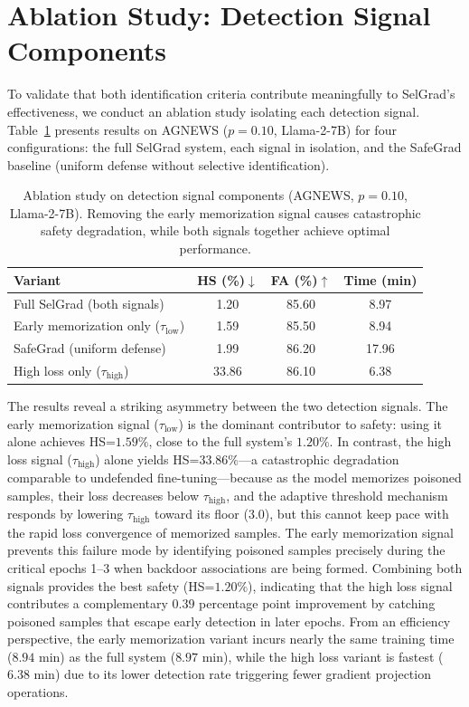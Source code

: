 \section{Ablation Study: Detection Signal Components}
\label{sec:ablation}

To validate that both identification criteria contribute meaningfully to SelGrad's effectiveness, we conduct an ablation study isolating each detection signal. Table~\ref{tab:ablation_detection} presents results on AGNEWS ($p=0.10$, Llama-2-7B) for four configurations: the full SelGrad system, each signal in isolation, and the SafeGrad baseline (uniform defense without selective identification).

\begin{table}[htbp]
\centering
\caption{Ablation study on detection signal components (AGNEWS, $p=0.10$, Llama-2-7B). Removing the early memorization signal causes catastrophic safety degradation, while both signals together achieve optimal performance.}
\label{tab:ablation_detection}
\begin{tabular}{lccc}
\toprule
\textbf{Variant} & \textbf{HS (\%)$\downarrow$} & \textbf{FA (\%)$\uparrow$} & \textbf{Time (min)} \\
\midrule
Full SelGrad (both signals) & \cellcolor{bestcolor}1.20 & 85.60 & 8.97 \\
Early memorization only ($\tau_{\text{low}}$) & 1.59 & 85.50 & 8.94 \\
SafeGrad (uniform defense) & 1.99 & \cellcolor{bestcolor}86.20 & 17.96 \\
High loss only ($\tau_{\text{high}}$) & 33.86 & 86.10 & \cellcolor{bestcolor}6.38 \\
\bottomrule
\end{tabular}
\end{table}

The results reveal a striking asymmetry between the two detection signals. The early memorization signal ($\tau_{\text{low}}$) is the dominant contributor to safety: using it alone achieves HS=$1.59\%$, close to the full system's $1.20\%$. In contrast, the high loss signal ($\tau_{\text{high}}$) alone yields HS=$33.86\%$---a catastrophic degradation comparable to undefended fine-tuning---because as the model memorizes poisoned samples, their loss decreases below $\tau_{\text{high}}$, and the adaptive threshold mechanism responds by lowering $\tau_{\text{high}}$ toward its floor (3.0), but this cannot keep pace with the rapid loss convergence of memorized samples. The early memorization signal prevents this failure mode by identifying poisoned samples precisely during the critical epochs 1--3 when backdoor associations are being formed. Combining both signals provides the best safety (HS=$1.20\%$), indicating that the high loss signal contributes a complementary $0.39$ percentage point improvement by catching poisoned samples that escape early detection in later epochs. From an efficiency perspective, the early memorization variant incurs nearly the same training time ($8.94$ min) as the full system ($8.97$ min), while the high loss variant is fastest ($6.38$ min) due to its lower detection rate triggering fewer gradient projection operations.

